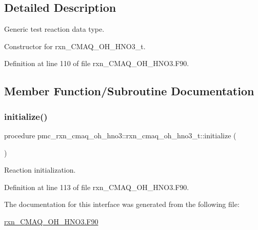 \subsection{Detailed Description}
Generic test reaction data type. 

Constructor for rxn\+\_\+\+C\+M\+A\+Q\+\_\+\+O\+H\+\_\+\+H\+N\+O3\+\_\+t. 

Definition at line 110 of file rxn\+\_\+\+C\+M\+A\+Q\+\_\+\+O\+H\+\_\+\+H\+N\+O3.\+F90.



\subsection{Member Function/\+Subroutine Documentation}
\mbox{\label{structpmc__rxn__cmaq__oh__hno3_1_1rxn__cmaq__oh__hno3__t_a10dea984f53fc68f75ad1529061680a5}} 
\subsubsection{\texorpdfstring{initialize()}{initialize()}}
{\footnotesize\ttfamily procedure pmc\+\_\+rxn\+\_\+cmaq\+\_\+oh\+\_\+hno3\+::rxn\+\_\+cmaq\+\_\+oh\+\_\+hno3\+\_\+t\+::initialize (\begin{DoxyParamCaption}{ }\end{DoxyParamCaption})\hspace{0.3cm}{\ttfamily [private]}}



Reaction initialization. 



Definition at line 113 of file rxn\+\_\+\+C\+M\+A\+Q\+\_\+\+O\+H\+\_\+\+H\+N\+O3.\+F90.



The documentation for this interface was generated from the following file\+:\begin{DoxyCompactItemize}
\item 
\mbox{\hyperlink{rxn___c_m_a_q___o_h___h_n_o3_8_f90}{rxn\+\_\+\+C\+M\+A\+Q\+\_\+\+O\+H\+\_\+\+H\+N\+O3.\+F90}}\end{DoxyCompactItemize}

